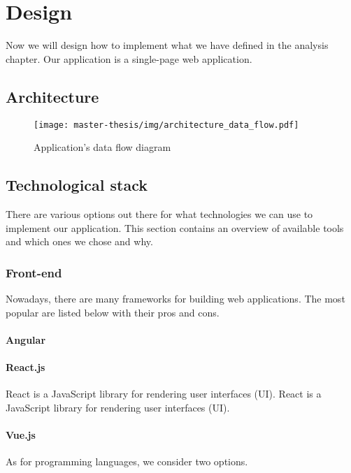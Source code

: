\chapter{Design}
Now we will design how to implement what we have defined in the analysis chapter.
Our application is a single-page web application.

\section{Architecture}
\begin{figure}[h]
  \centering
  \texttt{[image: master-thesis/img/architecture\_data\_flow.pdf]}
  \caption{Application's data flow diagram}
\end{figure}

\section{Technological stack}
There are various options out there for what technologies we can use to implement our application.
This section contains an overview of available tools and which ones we chose and why.

\subsection{Front-end}
Nowadays, there are many frameworks for building web applications.
The most popular are listed below with their pros and cons.

\subsubsection*{Angular}

\subsubsection*{React.js}
React is a JavaScript library for rendering user interfaces (UI). 
React is a JavaScript library for rendering user interfaces (UI). 

\subsubsection*{Vue.js}

As for programming languages, we consider two options. 

